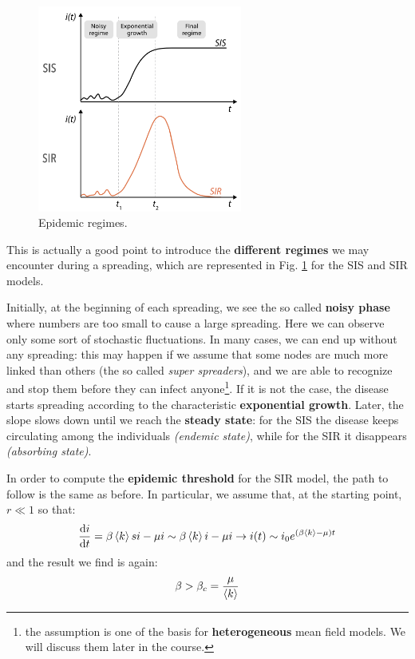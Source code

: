 \documentclass[../main/main.tex]{subfiles}
\begin{document}
\begin{figure}[h!]
\centering
\includegraphics[width=0.6\textwidth]{../lessons/image/03/6.png}
\caption{\label{fig:3_6} Epidemic regimes.}
\end{figure}

This is actually a good point to introduce the \textbf{different regimes} we may encounter during a spreading, which are represented in Fig. \ref{fig:3_6} for the SIS and SIR models.

Initially, at the beginning of each spreading, we see the so called \textbf{noisy phase} where numbers are too small to cause a large spreading. Here we can observe only some sort of stochastic fluctuations. In many cases, we can end up without any spreading: this may happen if we assume that some nodes are much more linked than others (the so called \textit{super spreaders}), and we are able to recognize and stop them before they can infect anyone\footnote{the assumption is one of the basis for \textbf{heterogeneous} mean field models. We will discuss them later in the course.}. If it is not the case, the disease starts spreading according to the characteristic \textbf{exponential growth}. Later, the slope slows down until we reach the \textbf{steady state}: for the SIS the disease keeps circulating among the individuals \textit{(endemic state)}, while for the SIR it disappears \textit{(absorbing state)}.

In order to compute the \textbf{epidemic threshold} for the SIR model, the path to follow is the same as before. In particular, we assume that, at the starting point, $ r \ll 1 $ so that:
\begin{equation*}
  \dv{i}{t} = \beta \expval{k} s i - \mu i \sim \beta \expval{k} i - \mu i \rightarrow i(t) \sim i_0 e^{(\beta \expval{k} - \mu  )t}
\end{equation*}
and the result we find is again:
\begin{equation}
  \beta > \beta _c = \frac{\mu }{\expval{k} }
\end{equation}
\end{document}
